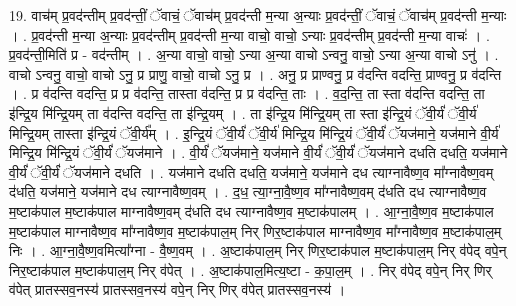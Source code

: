 \documentclass[17pt]{extarticle}
\begin{document}
19. वाच॑म् प्र॒वद॑न्तीम् प्र॒वद॑न्तीं॒ ॅवाचं॒ ॅवाच॑म् प्र॒वद॑न्ती म॒न्या अ॒न्याः प्र॒वद॑न्तीं॒ ॅवाचं॒ ॅवाच॑म् प्र॒वद॑न्ती म॒न्याः । . प्र॒वद॑न्ती म॒न्या अ॒न्याः प्र॒वद॑न्तीम् प्र॒वद॑न्ती म॒न्या वाचो॒ वाचो॒ ऽन्याः प्र॒वद॑न्तीम् प्र॒वद॑न्ती म॒न्या वाचः॑ । . प्र॒वद॑न्ती॒मिति॑ प्र - वद॑न्तीम् । . अ॒न्या वाचो॒ वाचो॒ ऽन्या अ॒न्या वाचो ऽन्वनु॒ वाचो॒ ऽन्या अ॒न्या वाचो ऽनु॑ । . वाचो ऽन्वनु॒ वाचो॒ वाचो ऽनु॒ प्र प्राणु॒ वाचो॒ वाचो ऽनु॒ प्र । . अनु॒ प्र प्राण्वनु॒ प्र व॑दन्ति वदन्ति॒ प्राण्वनु॒ प्र व॑दन्ति । . प्र व॑दन्ति वदन्ति॒ प्र प्र व॑दन्ति॒ तास्ता व॑दन्ति॒ प्र प्र व॑दन्ति॒ ताः । . व॒द॒न्ति॒ ता स्ता व॑दन्ति वदन्ति॒ ता इ॑न्द्रि॒य मि॑न्द्रि॒यम् ता व॑दन्ति वदन्ति॒ ता इ॑न्द्रि॒यम् । . ता इ॑न्द्रि॒य मि॑न्द्रि॒यम् ता स्ता इ॑न्द्रि॒यं ॅवी॒र्यं॑ ॅवी॒र्य॑ मिन्द्रि॒यम् तास्ता इ॑न्द्रि॒यं ॅवी॒र्य᳚म् । . इ॒न्द्रि॒यं ॅवी॒र्यं॑ ॅवी॒र्य॑ मिन्द्रि॒य मि॑न्द्रि॒यं ॅवी॒र्यं॑ ॅयज॑माने॒ यज॑माने वी॒र्य॑ मिन्द्रि॒य मि॑न्द्रि॒यं ॅवी॒र्यं॑ ॅयज॑माने । . वी॒र्यं॑ ॅयज॑माने॒ यज॑माने वी॒र्यं॑ ॅवी॒र्यं॑ ॅयज॑माने दधति दधति॒ यज॑माने वी॒र्यं॑ ॅवी॒र्यं॑ ॅयज॑माने दधति । . यज॑माने दधति दधति॒ यज॑माने॒ यज॑माने दध त्याग्नावैष्ण॒व मा᳚ग्नावैष्ण॒वम् द॑धति॒ यज॑माने॒ यज॑माने दध त्याग्नावैष्ण॒वम् । . द॒ध॒ त्या॒ग्ना॒वै॒ष्ण॒व मा᳚ग्नावैष्ण॒वम् द॑धति दध त्याग्नावैष्ण॒व म॒ष्टाक॑पाल म॒ष्टाक॑पाल माग्नावैष्ण॒वम् द॑धति दध त्याग्नावैष्ण॒व म॒ष्टाक॑पालम् । . आ॒ग्ना॒वै॒ष्ण॒व म॒ष्टाक॑पाल म॒ष्टाक॑पाल माग्नावैष्ण॒व मा᳚ग्नावैष्ण॒व म॒ष्टाक॑पाल॒म् निर् णिर॒ष्टाक॑पाल माग्नावैष्ण॒व मा᳚ग्नावैष्ण॒व म॒ष्टाक॑पाल॒म् निः । . आ॒ग्ना॒वै॒ष्ण॒वमित्या᳚ग्ना - वै॒ष्ण॒वम् । . अ॒ष्टाक॑पाल॒म् निर् णिर॒ष्टाक॑पाल म॒ष्टाक॑पाल॒म् निर् व॑पेद् वपे॒न् निर॒ष्टाक॑पाल म॒ष्टाक॑पाल॒म् निर् व॑पेत् । . अ॒ष्टाक॑पाल॒मित्य॒ष्टा - क॒पा॒ल॒म् । . निर् व॑पेद् वपे॒न् निर् णिर् व॑पेत् प्रातस्सव॒नस्य॑ प्रातस्सव॒नस्य॑ वपे॒न् निर् णिर् व॑पेत् प्रातस्सव॒नस्य॑ । \newline
\end{document}
